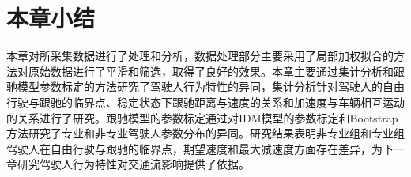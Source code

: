 


\section{本章小结}
本章对所采集数据进行了处理和分析，数据处理部分主要采用了局部加权拟合的方法对原始数据进行了平滑和筛选，取得了良好的效果。本章主要通过集计分析和跟驰模型参数标定的方法研究了驾驶人行为特性的异同，集计分析针对驾驶人的自由行驶与跟驰的临界点、稳定状态下跟驰距离与速度的关系和加速度与车辆相互运动的关系进行了研究。跟驰模型的参数标定通过对IDM模型的参数标定和Bootstrap方法研究了专业和非专业驾驶人参数分布的异同。研究结果表明非专业组和专业组驾驶人在自由行驶与跟驰的临界点，期望速度和最大减速度方面存在差异，为下一章研究驾驶人行为特性对交通流影响提供了依据。
